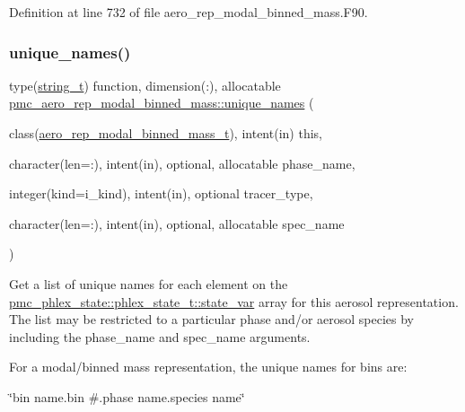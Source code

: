 Definition at line 732 of file aero\+\_\+rep\+\_\+modal\+\_\+binned\+\_\+mass.\+F90.

\mbox{\label{namespacepmc__aero__rep__modal__binned__mass_ad8403a50ee93f3bb281012fb75f6decb}} 
\subsubsection{\texorpdfstring{unique\+\_\+names()}{unique\_names()}}
{\footnotesize\ttfamily type(\mbox{\hyperlink{structpmc__util_1_1string__t}{string\+\_\+t}}) function, dimension(\+:), allocatable \mbox{\hyperlink{interfacepmc__aero__rep__data_1_1unique__names}{pmc\+\_\+aero\+\_\+rep\+\_\+modal\+\_\+binned\+\_\+mass\+::unique\+\_\+names}} (\begin{DoxyParamCaption}\item[{class(\mbox{\hyperlink{structpmc__aero__rep__modal__binned__mass_1_1aero__rep__modal__binned__mass__t}{aero\+\_\+rep\+\_\+modal\+\_\+binned\+\_\+mass\+\_\+t}}), intent(in)}]{this,  }\item[{character(len=\+:), intent(in), optional, allocatable}]{phase\+\_\+name,  }\item[{integer(kind=i\+\_\+kind), intent(in), optional}]{tracer\+\_\+type,  }\item[{character(len=\+:), intent(in), optional, allocatable}]{spec\+\_\+name }\end{DoxyParamCaption})\hspace{0.3cm}{\ttfamily [private]}}



Get a list of unique names for each element on the {\ttfamily \mbox{\hyperlink{structpmc__phlex__state_1_1phlex__state__t_a78835cb552d483ebbfc7a6bc6f756918}{pmc\+\_\+phlex\+\_\+state\+::phlex\+\_\+state\+\_\+t\+::state\+\_\+var}}} array for this aerosol representation. The list may be restricted to a particular phase and/or aerosol species by including the phase\+\_\+name and spec\+\_\+name arguments. 

For a modal/binned mass representation, the unique names for bins are\+:
\begin{DoxyItemize}
\item \char`\"{}bin name.\+bin \#.\+phase name.\+species name\char`\"{}
\end{DoxyItemize}

